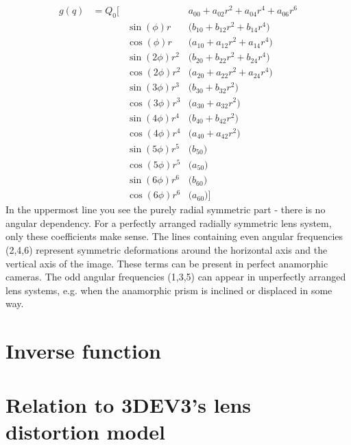 \documentclass[10pt,a4paper]{article}
\begin{document}
\begin{align}
g(q)	& = Q_0 \Big[		& 		& a_{00} + a_{02} r^2 + a_{04} r^4 + a_{06} r^6 \nonumber\\
	&			& \sin(\phi) r	& \big(	b_{10} + b_{12} r^2 + b_{14} r^4 \big) \nonumber\\
	&			& \cos(\phi) r	& \big( a_{10} + a_{12} r^2 + a_{14} r^4 \big) \nonumber\\
	&			& \sin(2\phi) r^2	& \big(b_{20} + b_{22} r^2 + b_{24} r^4 \big) \nonumber\\
	&			& \cos(2\phi) r^2	& \big(a_{20} + a_{22} r^2 + a_{24} r^4 \big) \nonumber\\
	&			& \sin(3\phi) r^3	& \big(b_{30} + b_{32} r^2 \big) \nonumber\\
	&			& \cos(3\phi) r^3	& \big(a_{30} + a_{32} r^2 \big) \nonumber\\
	&			& \sin(4\phi) r^4	& \big(b_{40} + b_{42} r^2 \big) \nonumber\\
	&			& \cos(4\phi) r^4	& \big(a_{40} + a_{42} r^2 \big) \nonumber\\
	&			& \sin(5\phi) r^5	& \big(b_{50} \big) \nonumber\\
	&			& \cos(5\phi) r^5	& \big(a_{50} \big) \nonumber\\
	&			& \sin(6\phi) r^6	& \big(b_{60} \big) \nonumber\\
	&			& \cos(6\phi) r^6	& \big(a_{60} \big) \Big]
\end{align}
In the uppermost line you see the purely radial symmetric part - there is no angular dependency.
For a perfectly arranged radially symmetric lens system, only these coefficients make sense.
The lines containing even angular frequencies (2,4,6) represent symmetric deformations around
the horizontal axis and the vertical axis of the image. These terms can be present in perfect anamorphic cameras.
The odd angular frequencies (1,3,5) can appear in unperfectly arranged lens systems, e.g. when the anamorphic prism
is inclined or displaced in some way.

\section{Inverse function}

\section{Relation to 3DEV3's lens distortion model}
\end{document}
